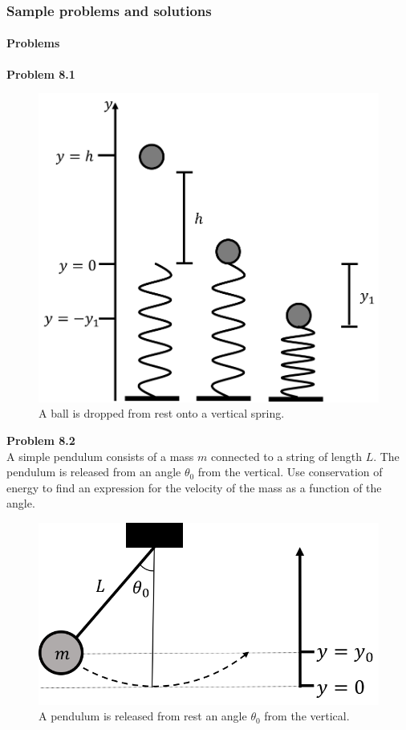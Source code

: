 \subsubsection{Sample problems and solutions}

\paragraph{Problems}

\begin{framed}
\textbf{Problem 8.1}\\
\begin{figure}[!htbp]
\centering
\includegraphics[width=0.4\linewidth]{files/massdropspring-f73fe0e55835506b4148fcc4430499ee.png}
\caption[]{A ball is dropped from rest onto a vertical spring.}
\label{fig:potentialecons:ballspring}
\end{figure}
\end{framed}

\begin{framed}
\textbf{Problem 8.2}\\
A simple pendulum consists of a mass $m$ connected to a string of length $L$. The pendulum is released from an angle $\theta_0$ from the vertical. Use conservation of energy to find an expression for the velocity of the mass as a function of the angle.

\begin{figure}[!htbp]
\centering
\includegraphics[width=0.4\linewidth]{files/pendulumvelocity-130b363d2f37b84b8531059415885194.png}
\caption[]{A pendulum is released from rest an angle $\theta_0$ from the vertical.}
\label{fig:potentialecons:pendulumvel}
\end{figure}
\end{framed}

